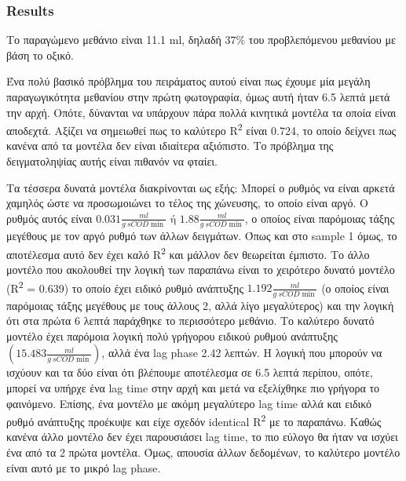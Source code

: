 \documentclass[11pt]{article}
\begin{document}
\subsubsection{Results}
\label{sec:orga46991a}
Το παραγώμενο μεθάνιο είναι 11.1 ml, δηλαδή \(37 \%\) του προβλεπόμενου μεθανίου με βάση το οξικό.

Ένα πολύ βασικό πρόβλημα του πειράματος αυτού είναι πως έχουμε μία μεγάλη παραγωγικότητα μεθανίου στην πρώτη φωτογραφία, όμως αυτή ήταν 6.5 λεπτά μετά την αρχή. Οπότε, δύνανται να υπάρχουν πάρα πολλά κινητικά μοντέλα τα οποία είναι αποδεχτά. Αξίζει να σημειωθεί πως το καλύτερο R\textsuperscript{2} είναι 0.724, το οποίο δείχνει πως κανένα από τα μοντέλα δεν είναι ιδιαίτερα αξιόπιστο. Το πρόβλημα της δειγματοληψίας αυτής είναι πιθανόν να φταίει.

Τα τέσσερα δυνατά μοντέλα διακρίνονται ως εξής: Μπορεί ο ρυθμός να είναι αρκετά χαμηλός ώστε να προσωμοιώνει το τέλος της χώνευσης, το οποίο είναι αργό. Ο ρυθμός αυτός είναι \(0.031 \frac{ml}{g ~ sCOD \min } \text{ ή } 1.88 \frac{ml}{g ~ sCOD \min }\), ο οποίος είναι παρόμοιας τάξης μεγέθους με τον αργό ρυθμό των άλλων δειγμάτων. Όπως και στο sample 1 όμως, το αποτέλεσμα αυτό δεν έχει καλό R\textsuperscript{2} και μάλλον δεν θεωρείται έμπιστο. Το άλλο μοντέλο που ακολουθεί την λογική των παραπάνω είναι το χειρότερο δυνατό μοντέλο (R\textsuperscript{2} = 0.639) το οποίο έχει ειδικό ρυθμό ανάπτυξης \(1.192 \frac{ml}{g ~ sCOD \min }\) (ο οποίος είναι παρόμοιας τάξης μεγέθους με τους άλλους 2, αλλά λίγο μεγαλύτερος) και την λογική ότι στα πρώτα 6 λεπτά παράχθηκε το περισσότερο μεθάνιο. Το καλύτερο δυνατό μοντέλο έχει παρόμοια λογική πολύ γρήγορου ειδικού ρυθμού ανάπτυξης \(\left( 15.483 \frac{ml}{g ~ sCOD \min } \right)\), αλλά ένα lag phase 2.42 λεπτών. Η λογική που μπορούν να ισχύουν και τα δύο είναι ότι βλέπουμε αποτέλεσμα σε 6.5 λεπτά περίπου, οπότε, μπορεί να υπήρχε ένα lag time στην αρχή και μετά να εξελίχθηκε πιο γρήγορα το φαινόμενο. Επίσης, ένα μοντέλο με ακόμη μεγαλύτερο lag time αλλά και ειδικό ρυθμό ανάπτυξης προέκυψε και είχε σχεδόν identical R\textsuperscript{2} με το παραπάνω. Καθώς κανένα άλλο μοντέλο δεν έχει παρουσιάσει lag time, το πιο εύλογο θα ήταν να ισχύει ένα από τα 2 πρώτα μοντέλα. Όμως, απουσία άλλων δεδομένων, το καλύτερο μοντέλο είναι αυτό με το μικρό lag phase.
\end{document}
